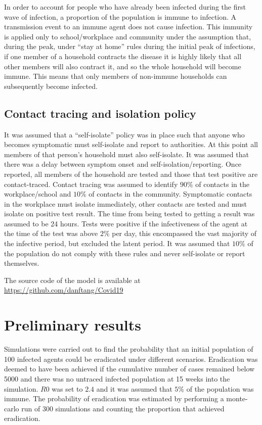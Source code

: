 \documentclass{article}
\begin{document}
In order to account for people who have already been infected during the first wave of infection, a proportion of the population is immune to infection. A transmission event to an immune agent does not cause infection. This immunity is applied only to school/workplace and community under the assumption that, during the peak, under ``stay at home'' rules during the initial peak of infections, if one member of a household contracts the disease it is highly likely that all other members will also contract it, and so the whole household will become immune. This means that only members of non-immune households can subsequently become infected.

\subsection{Contact tracing and isolation policy}

It was assumed that a ``self-isolate'' policy was in place such that anyone who becomes symptomatic must self-isolate and report to authorities. At this point all members of that person's household must also self-isolate. It was assumed that there was a delay between symptom onset and self-isolation/reporting. Once reported, all members of the household are tested and those that test positive are contact-traced. Contact tracing was assumed to identify $90\%$ of contacts in the workplace/school and $10\%$ of contacts in the community. Symptomatic contacts in the workplace must isolate immediately, other contacts are tested and must isolate on positive test result. The time from being tested to getting a result was assumed to be 24 hours. Tests were positive if the infectiveness of the agent at the time of the test was above $2\%$ per day, this encompassed the vast majority of the infective period, but excluded the latent period. It was assumed that $10\%$ of the population do not comply with these rules and never self-isolate or report themselves.

The source code of the model is available at \href{https://github.com/danftang/Covid19}{https://github.com/danftang/Covid19}

\section{Preliminary results}

Simulations were carried out to find the probability that an initial population of 100 infected agents could be eradicated under different scenarios. Eradication was deemed to have been achieved if the cumulative number of cases remained below 5000 and there was no untraced infected population at 15 weeks into the simulation. $R0$ was set to $2.4$\cite{ferguson2020impact} and it was assumed that $5\%$ of the population was immune. The probability of eradication was estimated by performing a monte-carlo run of 300 simulations and counting the proportion that achieved eradication.
\end{document}
